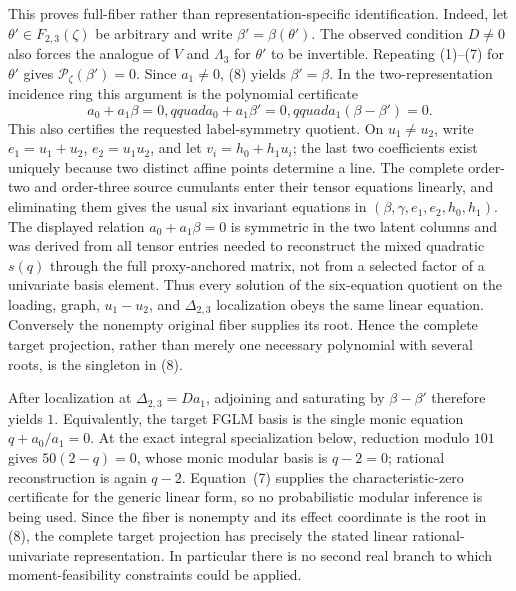 This proves full-fiber rather than representation-specific identification.  Indeed, let \(\theta'\in F_{2,3}(\zeta)\) be arbitrary and write \(\beta'=\beta(\theta')\).  The observed condition \(D\ne0\) also forces the analogue of \(V\) and \(\Lambda_3\) for \(\theta'\) to be invertible.  Repeating (1)--(7) for \(\theta'\) gives \(\mathcal P_\zeta(\beta')=0\).  Since \(a_1\ne0\), (8) yields \(\beta'=\beta\).  In the two-representation incidence ring this argument is the polynomial certificate
\[
 a_0+a_1\beta=0,qquad a_0+a_1\beta'=0,qquad
 a_1(\beta-\beta')=0.
\]
This also certifies the requested label-symmetry quotient.  On \(u_1\ne u_2\), write \(e_1=u_1+u_2\), \(e_2=u_1u_2\), and let \(v_i=h_0+h_1u_i\); the last two coefficients exist uniquely because two distinct affine points determine a line.  The complete order-two and order-three source cumulants enter their tensor equations linearly, and eliminating them gives the usual six invariant equations in \((\beta,\gamma,e_1,e_2,h_0,h_1)\).  The displayed relation \(a_0+a_1\beta=0\) is symmetric in the two latent columns and was derived from all tensor entries needed to reconstruct the mixed quadratic \(s(q)\) through the full proxy-anchored matrix, not from a selected factor of a univariate basis element.  Thus every solution of the six-equation quotient on the loading, graph, \(u_1-u_2\), and \(\Delta_{2,3}\) localization obeys the same linear equation.  Conversely the nonempty original fiber supplies its root.  Hence the complete target projection, rather than merely one necessary polynomial with several roots, is the singleton in (8).

After localization at \(\Delta_{2,3}=Da_1\), adjoining and saturating by \(\beta-\beta'\) therefore yields \(1\).  Equivalently, the target FGLM basis is the single monic equation \(q+a_0/a_1=0\).  At the exact integral specialization below, reduction modulo \(101\) gives \(50(2-q)=0\), whose monic modular basis is \(q-2=0\); rational reconstruction is again \(q-2\).  Equation~(7) supplies the characteristic-zero certificate for the generic linear form, so no probabilistic modular inference is being used.  Since the fiber is nonempty and its effect coordinate is the root in (8), the complete target projection has precisely the stated linear rational-univariate representation.  In particular there is no second real branch to which moment-feasibility constraints could be applied.

